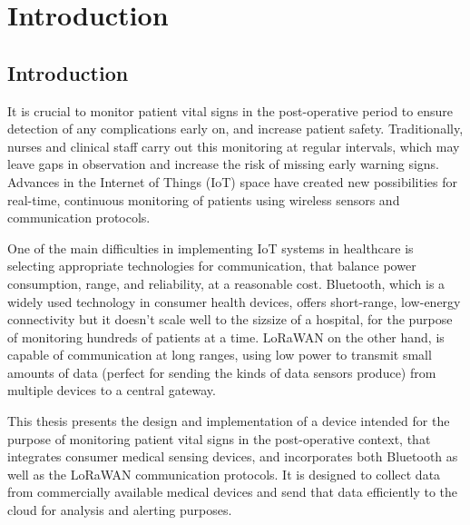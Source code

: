 \chapter{Introduction}

\section{Introduction} %
It is crucial to monitor patient vital signs in the post-operative period to ensure detection of any complications early on, and increase patient safety. Traditionally, nurses and clinical staff carry out this monitoring at regular intervals, which may leave gaps in observation and increase the risk of missing early warning signs. Advances in the Internet of Things (IoT) space have created new possibilities for real-time, continuous monitoring of patients using wireless sensors and communication protocols.

One of the main difficulties in implementing IoT systems in healthcare is selecting appropriate technologies for communication, that balance power consumption, range, and reliability, at a reasonable cost. Bluetooth, which is a widely used technology in consumer health devices, offers short-range, low-energy connectivity but it doesn't scale well to the sizsize of a hospital, for the purpose of monitoring hundreds of patients at a time. LoRaWAN on the other hand, is capable of communication at long ranges, using low power to transmit small amounts of data (perfect for sending the kinds of data sensors produce) from multiple devices to a central gateway.

This thesis presents the design and implementation of a device intended for the purpose of monitoring patient vital signs in the post-operative context, that integrates consumer medical sensing devices, and incorporates both Bluetooth as well as the LoRaWAN communication protocols. It is designed to collect data from commercially available medical devices and send that data efficiently to the cloud for analysis and alerting purposes.

